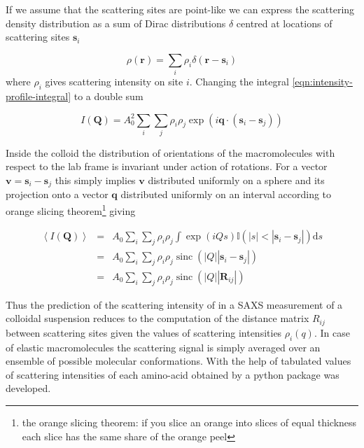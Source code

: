 \documentclass{doctoral}
\newcommand{\dd}{\mathrm{d}}
\newcommand{\code}[1]{\texttt{\detokenize{#1}}}
\begin{document}
If we assume that the scattering sites are point-like we can express the scattering density distribution as a sum of Dirac distributions $\delta$ centred at locations of scattering sites $\mathbf{s}_i$ 

\begin{equation}
    \rho(\mathbf{r}) = \sum_i \rho_i \delta(\mathbf{r}-\mathbf{s}_i)
\end{equation}
where $\rho_i$ gives scattering intensity on site $i$.
Changing the integral \eqref{eqn:intensity-profile-integral} to a double sum 

\begin{equation}
    I(\mathbf{Q}) = A_0^2 \sum_i \sum_j \rho_i \rho_j \exp(i \mathbf{q} \cdot (\mathbf{s}_i - \mathbf{s}_j))
\end{equation}

Inside the colloid the distribution of orientations of the macromolecules with respect to the lab frame is invariant under action of rotations.
For a vector $\mathbf{v} = \mathbf{s}_i - \mathbf{s}_j$ this simply implies $\mathbf{v}$ distributed uniformly on a sphere and its projection onto a vector $\mathbf{q}$ distributed uniformly on an interval according to orange slicing theorem\footnote{the orange slicing theorem: if you slice an orange into slices of equal thickness each slice has the same share of the orange peel} giving 

\begin{eqnarray}
    \left< I(\mathbf{Q}) \right> & = & A_0 \sum_i \sum_j \rho_i \rho_j \int \exp(i Q s) \mathbb{I}(|s| < |\mathbf{s}_i - \mathbf{s}_j|) \dd s \\
                                 & = & A_0 \sum_i \sum_j \rho_i \rho_j \operatorname{sinc}(|Q||\mathbf{s}_i - \mathbf{s}_j|)                  \\
                                 & = & A_0 \sum_i \sum_j \rho_i \rho_j \operatorname{sinc}(|Q||\mathbf{R}_{ij}|)
\end{eqnarray}

Thus the prediction of the scattering intensity of in a SAXS measurement of a colloidal suspension reduces to the computation of the distance matrix $R_{ij}$ between scattering sites given the values of scattering intensities $\rho_i(q)$.
In case of elastic macromolecules the scattering signal is simply averaged over an ensemble of possible molecular conformations.
With the help of tabulated values of scattering intensities of each amino-acid obtained by \textcite{Tong_2016} a python package \code{saxs_single_bead} was developed.
\end{document}
